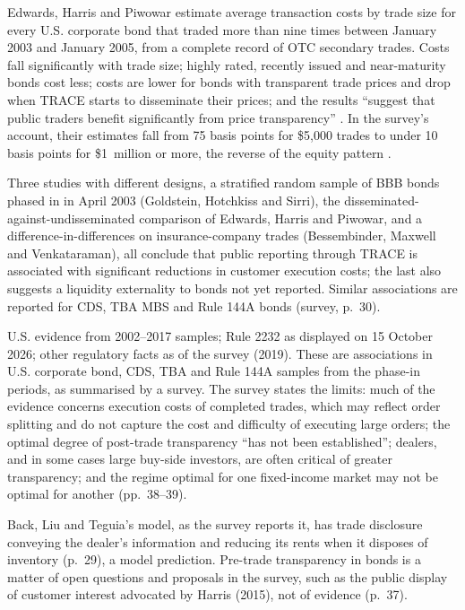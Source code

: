 \begin{qfevidence}\label{ev:bond-transparency-trading-costs}
 Edwards, Harris and Piwowar estimate average transaction costs by trade size for every U.S. corporate bond that traded more than nine times between January 2003 and January 2005, from a complete record of OTC secondary trades. Costs fall significantly with trade size; highly rated, recently issued and near-maturity bonds cost less; costs are lower for bonds with transparent trade prices and drop when TRACE starts to disseminate their prices; and the results ``suggest that public traders benefit significantly from price transparency'' \citep[abstract]{wide-edwards-harris-piwowar}. In the survey's account, their estimates fall from 75 basis points for \$5{,}000 trades to under 10 basis points for \$1~million or more, the reverse of the equity pattern \citep[p.~5]{wide-bsv-fi-survey}.

Three studies with different designs, a stratified random sample of BBB bonds phased in in April 2003 (Goldstein, Hotchkiss and Sirri), the disseminated-against-undisseminated comparison of Edwards, Harris and Piwowar, and a difference-in-differences on insurance-company trades (Bessembinder, Maxwell and Venkataraman), all conclude that public reporting through TRACE is associated with significant reductions in customer execution costs; the last also suggests a liquidity externality to bonds not yet reported. Similar associations are reported for CDS, TBA MBS and Rule 144A bonds (survey, p.~30).

 U.S. evidence from 2002--2017 samples; Rule 2232 as displayed on 15 October 2026; other regulatory facts as of the survey (2019). These are associations in U.S. corporate bond, CDS, TBA and Rule 144A samples from the phase-in periods, as summarised by a survey. The survey states the limits: much of the evidence concerns execution costs of completed trades, which may reflect order splitting and do not capture the cost and difficulty of executing large orders; the optimal degree of post-trade transparency ``has not been established''; dealers, and in some cases large buy-side investors, are often critical of greater transparency; and the regime optimal for one fixed-income market may not be optimal for another (pp.~38--39).

Back, Liu and Teguia's model, as the survey reports it, has trade disclosure conveying the dealer's information and reducing its rents when it disposes of inventory (p.~29), a model prediction. Pre-trade transparency in bonds is a matter of open questions and proposals in the survey, such as the public display of customer interest advocated by Harris (2015), not of evidence (p.~37).


\end{qfevidence}
